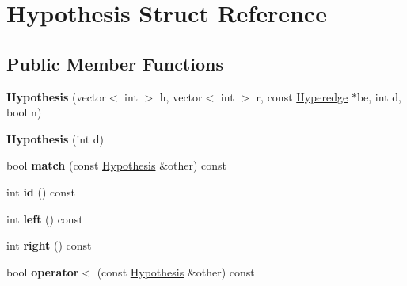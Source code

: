 \hypertarget{structHypothesis}{
\section{Hypothesis Struct Reference}
\label{structHypothesis}
}
\subsection*{Public Member Functions}
\begin{DoxyCompactItemize}
\item 
\hypertarget{structHypothesis_a14ef162a1130a032a557f2fffb22021c}{
{\bfseries Hypothesis} (vector$<$ int $>$ h, vector$<$ int $>$ r, const \hyperlink{classScarab_1_1Hyperedge}{Hyperedge} $\ast$be, int d, bool n)}
\label{structHypothesis_a14ef162a1130a032a557f2fffb22021c}

\item 
\hypertarget{structHypothesis_aa7ddcf20eb35bde418768622125daa4d}{
{\bfseries Hypothesis} (int d)}
\label{structHypothesis_aa7ddcf20eb35bde418768622125daa4d}

\item 
\hypertarget{structHypothesis_ae7706b20be3de3aa79471e2a2293ce7a}{
bool {\bfseries match} (const \hyperlink{structHypothesis}{Hypothesis} \&other) const }
\label{structHypothesis_ae7706b20be3de3aa79471e2a2293ce7a}

\item 
\hypertarget{structHypothesis_aa8a7f033c6ed9a439482d726f4435042}{
int {\bfseries id} () const }
\label{structHypothesis_aa8a7f033c6ed9a439482d726f4435042}

\item 
\hypertarget{structHypothesis_aaaae0eb7a9b8b0a79e379ea59bf87ec4}{
int {\bfseries left} () const }
\label{structHypothesis_aaaae0eb7a9b8b0a79e379ea59bf87ec4}

\item 
\hypertarget{structHypothesis_ac93fa567df306907d438af7ea270d46b}{
int {\bfseries right} () const }
\label{structHypothesis_ac93fa567df306907d438af7ea270d46b}

\item 
\hypertarget{structHypothesis_a7ebf0950bd01963be73f0bc6b63f7eb2}{
bool {\bfseries operator$<$} (const \hyperlink{structHypothesis}{Hypothesis} \&other) const }
\label{structHypothesis_a7ebf0950bd01963be73f0bc6b63f7eb2}

\end{DoxyCompactItemize}
